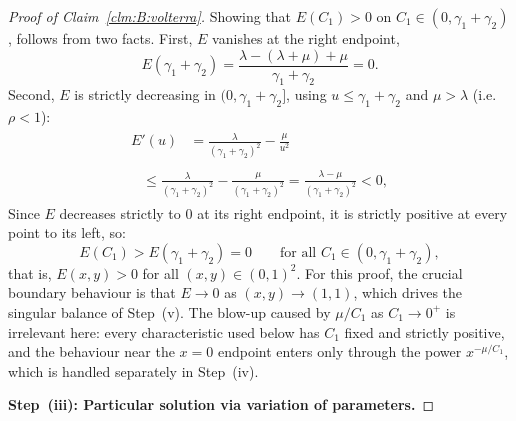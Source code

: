 \begin{proof}[Proof of Claim~\ref{clm:B:volterra}]
    Showing that $E(C_1)>0$ on $C_1\in(0,\gamma_1+\gamma_2)$, follows from two facts. First, $E$ vanishes at the right endpoint,
    \begin{equation*}
        E(\gamma_1+\gamma_2)
        = \frac{\lambda-(\lambda+\mu)+\mu}{\gamma_1+\gamma_2} = 0.
    \end{equation*}
    Second, $E$ is strictly decreasing in $(0,\gamma_1+\gamma_2]$, using $u\le\gamma_1+\gamma_2$ and $\mu>\lambda$ (i.e.\ $\rho<1$):
    \begin{align*}
        \begin{split}
            E'(u) &= \frac{\lambda}{(\gamma_1+\gamma_2)^2} - \frac{\mu}{u^2}
        \end{split}\\
        \begin{split}
            &\le \frac{\lambda}{(\gamma_1+\gamma_2)^2} - \frac{\mu}{(\gamma_1+\gamma_2)^2}
            = \frac{\lambda-\mu}{(\gamma_1+\gamma_2)^2} < 0,
        \end{split}
    \end{align*}
    Since $E$ decreases strictly to $0$ at its right endpoint, it is strictly positive at every point to its left, so:
    \begin{equation*}
        E(C_1) > E(\gamma_1+\gamma_2) = 0 \qquad\text{for all } C_1\in(0,\gamma_1+\gamma_2),
    \end{equation*}
    that is, $E(x,y) > 0$ for all $(x,y)\in(0,1)^2$. For this proof, the crucial boundary behaviour is that $E \to 0$ as $(x,y) \to (1,1)$, which drives the singular balance of Step~(v). The blow-up caused by $\mu/C_1$ as $C_1 \to 0^+$ is irrelevant here: every characteristic used below has $C_1$ fixed and strictly positive, and the behaviour near the $x=0$ endpoint enters only through the power $x^{-\mu/C_1}$, which is handled separately in Step~(iv).
    
    \medskip\noindent\textbf{Step~(iii): Particular solution via variation of parameters.}
    

\end{proof}
